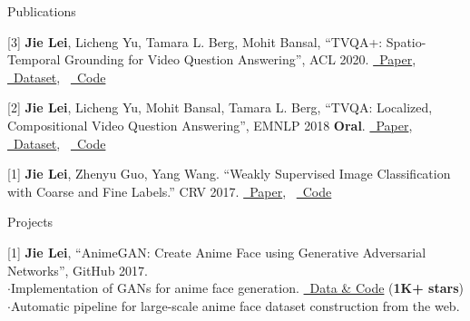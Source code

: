 \documentclass{resume} %
\begin{document}
\begin{rSection}{Publications}
{         }               
   \item {[3] \textbf{Jie Lei}, Licheng Yu, Tamara L. Berg, Mohit Bansal,
               ``TVQA+: Spatio-Temporal Grounding for Video Question Answering'',
               ACL 2020.
               \href{https://arxiv.org/abs/1904.11574}{\color{codelinkcolor}\faFile~Paper},~
               \href{http://tvqa.cs.unc.edu/}{\color{codelinkcolor}\faDatabase~Dataset},~
               \href{https://github.com/jayleicn/TVQA-PLUS}{\color{codelinkcolor}\faGithub~Code}
               }
    \item {[2] \textbf{Jie Lei}, Licheng Yu, Mohit Bansal, Tamara L. Berg, 
               ``TVQA: Localized, Compositional Video Question Answering'',
               EMNLP 2018 {\color{bittersweet}\textbf{Oral}}.
               \href{https://arxiv.org/abs/1809.01696}{\color{codelinkcolor}\faFile~Paper},~
               \href{http://tvqa.cs.unc.edu/}{\color{codelinkcolor}\faDatabase~Dataset},~
               \href{https://github.com/jayleicn/TVQA}{\color{codelinkcolor}\faGithub~Code}
               }
    \item {[1] \textbf{Jie Lei}, Zhenyu Guo, Yang Wang.
                ``Weakly Supervised Image Classification with Coarse and Fine Labels.''
                CRV 2017.
                \href{https://www.cs.unc.edu/~jielei/pdfs/crv17_classification.pdf}{\color{codelinkcolor}\faFile~Paper},~
                \href{https://github.com/jayleicn/classification-with-coarse-fine-labels}{\color{codelinkcolor}\faGithub~Code}
                }
\end{rSection}


\begin{rSection}{Projects}
    \item {[1] \textbf{Jie Lei},
                ``AnimeGAN: Create Anime Face using Generative Adversarial Networks'',
                GitHub 2017.
                \\ $\cdot$\quad Implementation of GANs for anime face generation. 
                \href{https://github.com/jayleicn/animeGAN}{\color{codelinkcolor}\faGithub~Data \& Code} (\textbf{1K+ stars})
                \\ $\cdot$\quad Automatic pipeline for large-scale anime face dataset construction from the web.}
\end{rSection}
\end{document}
